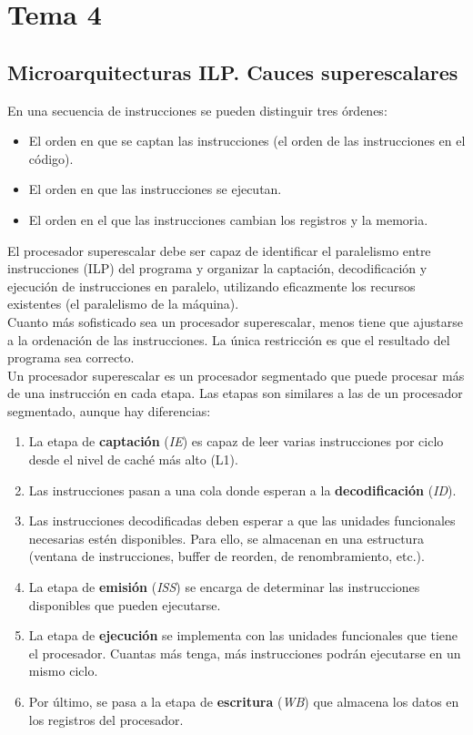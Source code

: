 \documentclass[12pt,spanish]{article}
\begin{document}
\section{Tema 4}

\subsection{Microarquitecturas ILP. Cauces superescalares}


En una secuencia de instrucciones se pueden distinguir tres órdenes:

\begin{itemize}
	\item El orden en que se captan las instrucciones (el orden de las instrucciones en el código).
	\item El orden en que las instrucciones se ejecutan.
	\item El orden en el que las instrucciones cambian los registros y la memoria.
\end{itemize}

El procesador superescalar debe ser capaz de identificar el paralelismo entre instrucciones (ILP) del programa y organizar la captación, decodificación y ejecución de instrucciones en paralelo, utilizando eficazmente los recursos existentes (el paralelismo de la máquina).\\

Cuanto más sofisticado sea un procesador superescalar, menos tiene que ajustarse a la ordenación de las instrucciones. La única restricción es que el resultado del programa sea correcto.\\

Un procesador superescalar es un procesador segmentado que puede procesar más de una instrucción en cada etapa. Las etapas son similares a las de un procesador segmentado, aunque hay diferencias:

\begin{enumerate}
	\item La etapa de \textbf{captación} (\textit{IE}) es capaz de leer varias instrucciones por ciclo desde el nivel de caché más alto (L1).
	\item Las instrucciones pasan a una cola donde esperan a la \textbf{decodificación} (\textit{ID}).
	\item Las instrucciones decodificadas deben esperar a que las unidades funcionales necesarias estén disponibles. Para ello, se almacenan en una estructura (ventana de instrucciones, buffer de reorden, de renombramiento, etc.).
	\item La etapa de \textbf{emisión} (\textit{ISS}) se encarga de determinar las instrucciones disponibles que pueden ejecutarse.
	\item La etapa  de \textbf{ejecución} se implementa con las unidades funcionales que tiene el procesador. Cuantas más tenga, más instrucciones podrán ejecutarse en un mismo ciclo.
	\item Por último, se pasa a la etapa de \textbf{escritura} (\textit{WB}) que almacena los datos en los registros del procesador.
\end{enumerate}
\end{document}
